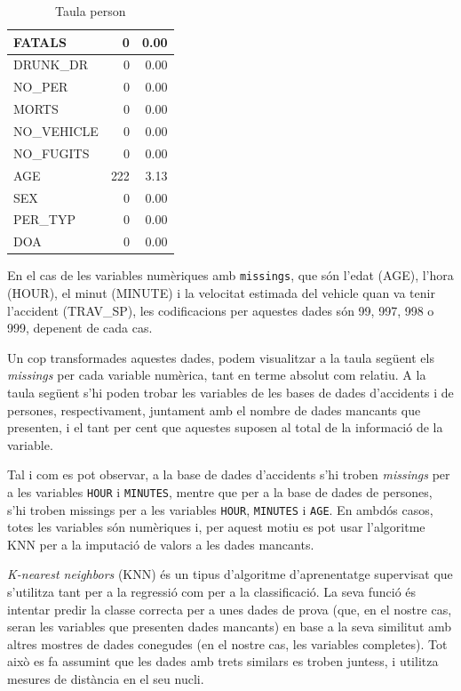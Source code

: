 \documentclass[11pt,longbibliography]{article}
\theoremstyle{definition}
\theoremstyle{remark}
\begin{document}
\begin{table}[H]
{\begin{tabular}{l|r|r|}
\multicolumn{1}{|l|}{FATALS}      & 0   & 0.00 \\ \hline
\multicolumn{1}{|l|}{DRUNK\_DR}   & 0   & 0.00 \\ \hline
\multicolumn{1}{|l|}{NO\_PER}     & 0   & 0.00 \\ \hline
\multicolumn{1}{|l|}{MORTS}       & 0   & 0.00 \\ \hline
\multicolumn{1}{|l|}{NO\_VEHICLE} & 0   & 0.00 \\ \hline
\multicolumn{1}{|l|}{NO\_FUGITS}  & 0   & 0.00 \\ \hline
\multicolumn{1}{|l|}{AGE}         & 222 & 3.13 \\ \hline
\multicolumn{1}{|l|}{SEX}         & 0   & 0.00 \\ \hline
\multicolumn{1}{|l|}{PER\_TYP}    & 0   & 0.00 \\ \hline
\multicolumn{1}{|l|}{DOA}         & 0   & 0.00 \\ \hline
\end{tabular}
\caption{Taula person}
}
\end{table}


En el cas de les variables numèriques amb \texttt{missings}, que són l'edat (AGE), l'hora (HOUR), el minut (MINUTE) i la velocitat estimada del vehicle quan va tenir l'accident (TRAV\_SP), les codificacions per aquestes dades són 99, 997, 998 o 999, depenent de cada cas.


Un cop transformades aquestes dades, podem visualitzar a la taula següent els \emph{missings} per cada variable numèrica, tant en terme absolut com relatiu. A la taula següent s'hi poden trobar les variables de les bases de dades d'accidents i de persones, respectivament, juntament amb el nombre de dades mancants que presenten, i el tant per cent que aquestes suposen al total de la informació de la variable.


Tal i com es pot observar, a la base de dades d'accidents s'hi troben \emph{missings} per a les variables \texttt{HOUR} i \texttt{MINUTES}, mentre que per a la base de dades de persones, s'hi troben missings per a les variables \texttt{HOUR}, \texttt{MINUTES} i \texttt{AGE}. En ambdós casos, totes les variables són numèriques i, per aquest motiu es pot usar l'algoritme KNN per a la imputació de valors a les dades mancants.


\emph{K-nearest neighbors} (KNN) és un tipus d'algoritme d'aprenentatge supervisat que s'utilitza tant per a la regressió com per a la classificació. La seva funció és intentar predir la classe correcta per a unes dades de prova (que, en el nostre cas, seran les variables que presenten dades mancants) en base a la seva similitut amb altres mostres de dades conegudes (en el nostre cas, les variables completes). Tot això es fa assumint que les dades amb trets similars es troben juntess, i utilitza mesures de distància en el seu nucli.
\end{document}
